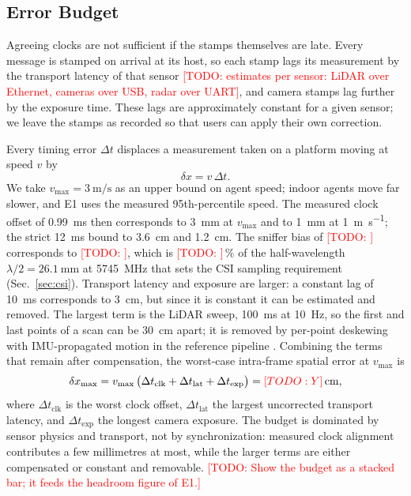 \documentclass[journal]{IEEEtran}
\newcommand{\todo}[1]{\textcolor{red}{[TODO: #1]}}
\begin{document}
\subsection{Error Budget}
\label{sec:budget}
Agreeing clocks are not sufficient if the stamps themselves are late.
Every message is stamped on arrival at its host, so each stamp lags
its measurement by the transport latency of that sensor
\todo{estimates per sensor: LiDAR over Ethernet, cameras over USB,
radar over UART}, and camera stamps lag further by the exposure time.
These lags are approximately constant for a given sensor; we leave the
stamps as recorded so that users can apply their own correction.

Every timing error $\Delta t$ displaces a measurement taken on a
platform moving at speed $v$ by
\begin{equation}
  \delta x = v \, \Delta t .
  \label{eq:time_bound}
\end{equation}
We take $v_{\max} = \SI{3}{\metre\per\second}$ as an upper bound on
agent speed; indoor agents move far slower, and E1 uses the measured
95th-percentile speed. The measured clock offset of
\SI{0.99}{\milli\second} then corresponds to \SI{3}{\milli\metre}
at $v_{\max}$ and to \SI{1}{\milli\metre} at \SI{1}{\metre\per\second};
the strict \SI{12}{\milli\second} bound to \SI{3.6}{\centi\metre}
and \SI{1.2}{\centi\metre}. The sniffer bias of \todo{} corresponds
to \todo{}, which is \todo{}\,\% of the half-wavelength
$\lambda/2 = \SI{26.1}{\milli\metre}$ at \SI{5745}{\mega\hertz} that
sets the CSI sampling requirement (Sec.~\ref{sec:csi}). Transport
latency and exposure are larger: a constant lag of
\SI{10}{\milli\second} corresponds to \SI{3}{\centi\metre}, but since
it is constant it can be estimated and removed. The largest term is
the LiDAR sweep, \SI{100}{\milli\second} at \SI{10}{\hertz}, so the
first and last points of a scan can be \SI{30}{\centi\metre} apart;
it is removed by per-point deskewing with IMU-propagated motion in the
reference pipeline \cite{glim}. Combining the terms that remain after
compensation, the worst-case intra-frame spatial error at $v_{\max}$ is
\begin{equation}
  \delta x_{\max} = v_{\max}\,\big(\Delta t_{\mathrm{clk}}
  + \Delta t_{\mathrm{lat}} + \Delta t_{\mathrm{exp}}\big)
  = \todo{Y}\,\si{\centi\metre},
  \label{eq:fusion_bound}
\end{equation}
where $\Delta t_{\mathrm{clk}}$ is the worst clock offset,
$\Delta t_{\mathrm{lat}}$ the largest uncorrected transport latency,
and $\Delta t_{\mathrm{exp}}$ the longest camera exposure. The budget
is dominated by sensor physics and transport, not by synchronization:
measured clock alignment contributes a few millimetres at most, while
the larger terms are either compensated or constant and removable. \todo{Show the
budget as a stacked bar; it feeds the headroom figure of E1.}
\end{document}
